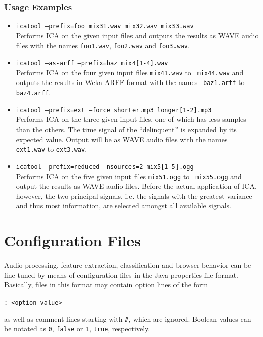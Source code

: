\subsubsection{Usage Examples}

\begin{itemize}
  \item {\tt icatool --prefix=foo mix31.wav mix32.wav mix33.wav}\\
    Performs ICA on the given input files and outputs the results as WAVE audio
    files with the names {\tt foo1.wav}, {\tt foo2.wav} and {\tt foo3.wav}.
  \item {\tt icatool --as-arff --prefix=baz mix4[1-4].wav}\\ 
    Performs ICA on the four given input files {\tt mix41.wav} to {\tt
    mix44.wav} and outputs the results in Weka ARFF format with the names {\tt
    baz1.arff} to {\tt baz4.arff}.
  \item {\tt icatool --prefix=ext --force shorter.mp3 longer[1-2].mp3}\\
    Performs ICA on the three given input files, one of which has less samples
    than the others. The time signal of the ``delinquent'' is expanded by its
    expected value. Output will be as WAVE audio files with the names {\tt
      ext1.wav} to {\tt ext3.wav}.
  \item {\tt icatool --prefix=reduced --nsources=2 mix5[1-5].ogg}\\
    Performs ICA on the five given input files {\tt mix51.ogg} to {\tt
      mix55.ogg} and output the results as WAVE audio files. Before the actual
    application of ICA, however, the two principal signals, i.e. the signals
    with the greatest variance and thus most information, are selected amongst
    all available signals.
\end{itemize}


\section{Configuration Files}

\label{section:ConfigFiles}

Audio processing, feature extraction, classification and browser behavior can be
fine-tuned by means of configuration files in the Java properties file
format. Basically, files in this format may contain option lines of the form

\centerline{\tt <option-name>: <option-value>}

as well as comment lines starting with {\tt \#}, which are ignored. Boolean
values can be notated as {\tt 0}, {\tt false} or {\tt 1}, {\tt true},
respectively.\\


